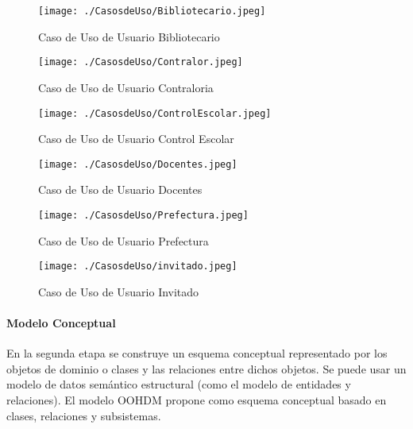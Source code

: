 \begin{figure}[H]
\centering
	\texttt{[image: ./CasosdeUso/Bibliotecario.jpeg]}
	\caption{Caso de Uso de Usuario Bibliotecario}	
\end{figure}

\begin{figure}[H]	
	\centering
	\texttt{[image: ./CasosdeUso/Contralor.jpeg]}
	\caption{Caso de Uso de Usuario Contraloria}
\end{figure}

\begin{figure}[H]
\centering
	\texttt{[image: ./CasosdeUso/ControlEscolar.jpeg]}
	\caption{Caso de Uso de Usuario Control Escolar}	
\end{figure}

\begin{figure}[H]
\centering
	\texttt{[image: ./CasosdeUso/Docentes.jpeg]}
	\caption{Caso de Uso de Usuario Docentes}	
\end{figure}

\begin{figure}[H]
\centering
	\texttt{[image: ./CasosdeUso/Prefectura.jpeg]}
	\caption{Caso de Uso de Usuario Prefectura}	
\end{figure}

\begin{figure}[H]
\centering
	\texttt{[image: ./CasosdeUso/invitado.jpeg]}
	\caption{Caso de Uso de Usuario Invitado}	
\end{figure}

\paragraph{Modelo Conceptual}
{\large En la segunda etapa se construye un esquema conceptual representado por los objetos de dominio o clases y las relaciones entre dichos objetos. Se puede usar un modelo de datos semántico estructural (como el modelo de entidades y relaciones). El modelo OOHDM propone como esquema conceptual basado en clases, relaciones y subsistemas.}\\

